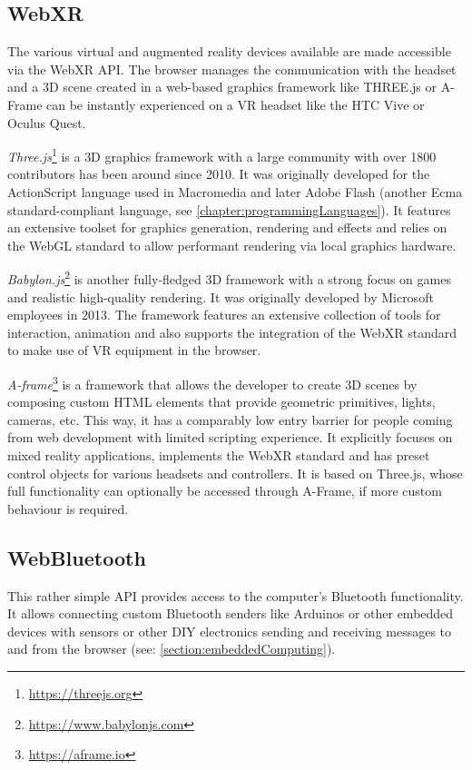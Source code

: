 \subsection{WebXR}

The various virtual and augmented reality devices available are made accessible via the WebXR \ac{API}. The browser manages the communication with the headset and a \ac{3D} scene created in a web-based graphics framework like THREE.js or A-Frame can be instantly experienced on a \ac{VR} headset like the HTC Vive or Oculus Quest.



\emph{Three.js}\footnote{\url{https://threejs.org}} is a \ac{3D} graphics framework with a large community with over 1800 contributors has been around since 2010. It was originally developed for the ActionScript language used in Macromedia and later Adobe Flash (another Ecma standard-compliant language, see \autoref{chapter:programmingLanguages}). It features an extensive toolset for graphics generation, rendering and effects and relies on the WebGL standard to allow performant rendering via local graphics hardware.

\emph{Babylon.js}\footnote{\url{https://www.babylonjs.com}} is another fully-fledged \ac{3D} framework with a strong focus on games and realistic high-quality rendering. It was originally developed by Microsoft employees in 2013. The framework features an extensive collection of tools for interaction, animation and also supports the integration of the \ac{WebXR} standard to make use of \ac{VR} equipment in the browser.

\emph{A-frame}\footnote{\url{https://aframe.io}} is a framework that allows the developer to create \ac{3D} scenes by composing custom HTML elements that provide geometric primitives, lights, cameras, etc. This way, it has a comparably low entry barrier for people coming from web development with limited scripting experience. It explicitly focuses on mixed reality applications, implements the WebXR standard and has preset control objects for various headsets and controllers. It is based on Three.js, whose full functionality can optionally be accessed through A-Frame, if more custom behaviour is required.

\subsection{WebBluetooth}

This rather simple \ac{API} provides access to the computer's Bluetooth functionality. It allows connecting custom Bluetooth senders like Arduinos or other embedded devices with sensors or other \ac{DIY} electronics sending and receiving messages to and from the browser (see: \autoref{section:embeddedComputing}).

